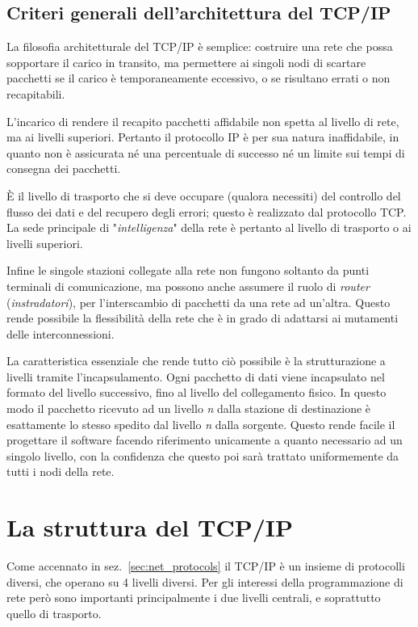 \subsection{Criteri generali dell'architettura del TCP/IP}
\label{sec:net_tcpip_design}

La filosofia architetturale del TCP/IP è semplice: costruire una rete che
possa sopportare il carico in transito, ma permettere ai singoli nodi di
scartare pacchetti se il carico è temporaneamente eccessivo, o se risultano
errati o non recapitabili.

L'incarico di rendere il recapito pacchetti affidabile non spetta al livello
di rete, ma ai livelli superiori. Pertanto il protocollo IP è per sua natura
inaffidabile, in quanto non è assicurata né una percentuale di successo né un
limite sui tempi di consegna dei pacchetti.

È il livello di trasporto che si deve occupare (qualora necessiti) del
controllo del flusso dei dati e del recupero degli errori; questo è realizzato
dal protocollo TCP. La sede principale di "\textit{intelligenza}" della rete è
pertanto al livello di trasporto o ai livelli superiori.

Infine le singole stazioni collegate alla rete non fungono soltanto da punti
terminali di comunicazione, ma possono anche assumere il ruolo di
\textit{router} (\textsl{instradatori}), per l'interscambio di pacchetti da
una rete ad un'altra. Questo rende possibile la flessibilità della rete che è
in grado di adattarsi ai mutamenti delle interconnessioni.

La caratteristica essenziale che rende tutto ciò possibile è la strutturazione
a livelli tramite l'incapsulamento. Ogni pacchetto di dati viene incapsulato
nel formato del livello successivo, fino al livello del collegamento fisico.
In questo modo il pacchetto ricevuto ad un livello \textit{n} dalla stazione
di destinazione è esattamente lo stesso spedito dal livello \textit{n} dalla
sorgente.  Questo rende facile il progettare il software facendo riferimento
unicamente a quanto necessario ad un singolo livello, con la confidenza che
questo poi sarà trattato uniformemente da tutti i nodi della rete.


\section{La struttura del TCP/IP}
\label{sec:net_tpcip}

Come accennato in sez.~\ref{sec:net_protocols} il TCP/IP è un insieme di
protocolli diversi, che operano su 4 livelli diversi. Per gli interessi della
programmazione di rete però sono importanti principalmente i due livelli
centrali, e soprattutto quello di trasporto.

